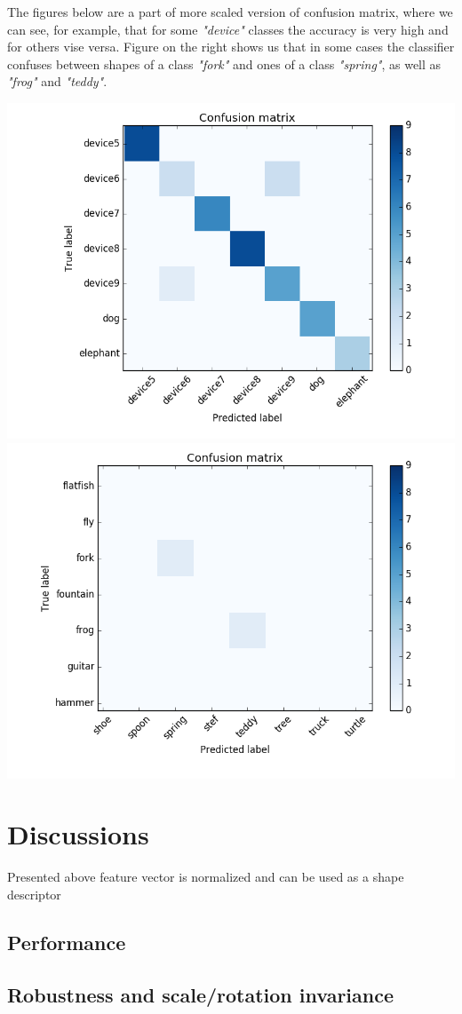 \documentclass[12pt]{article}
\begin{document}
The figures below are a part of more scaled version of confusion matrix, where we can see, for example, that for some \textit{"device"} classes the accuracy is very high and for others vise versa. Figure on the right shows us that in some cases the classifier confuses between shapes of a class \textit{"fork"} and ones of a class \textit{"spring"}, as well as \textit{"frog"} and \textit{"teddy"}.   

\includegraphics[scale=0.4]{device.png} 
\includegraphics[scale=0.4]{fork_fish.png} 

\section{Discussions}
Presented above feature vector is normalized and can be used as a shape descriptor  

\subsection{Performance}
\subsection{Robustness and scale/rotation invariance}



\end{document}
